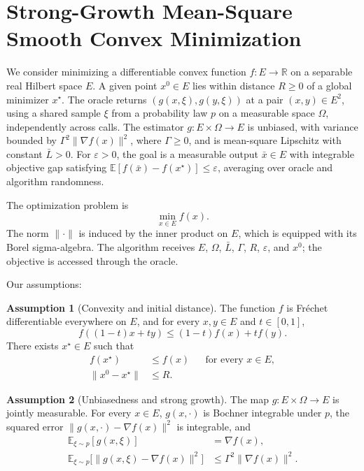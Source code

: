 \documentclass[10pt]{article}
\theoremstyle{definition}
\newtheorem{assumption}{Assumption}
\begin{document}
\section*{Strong-Growth Mean-Square Smooth Convex Minimization}
We consider minimizing a differentiable convex function $f:E\to\mathbb{R}$ on a separable real Hilbert space $E$. A given point $x^0\in E$ lies within distance $R\geq0$ of a global minimizer $x^\star$. The oracle returns $(g(x,\xi),g(y,\xi))$ at a pair $(x,y)\in E^2$, using a shared sample $\xi$ from a probability law $p$ on a measurable space $\Omega$, independently across calls. The estimator $g:E\times\Omega\to E$ is unbiased, with variance bounded by $\Gamma^2\|\nabla f(x)\|^2$, where $\Gamma\geq0$, and is mean-square Lipschitz with constant $\bar{L}>0$. For $\varepsilon>0$, the goal is a measurable output $\bar{x}\in E$ with integrable objective gap satisfying $\mathbb{E}[f(\bar{x})-f(x^\star)]\leq\varepsilon$, averaging over oracle and algorithm randomness.

The optimization problem is
\[
\min_{x\in E} f(x).
\]
The norm $\|\cdot\|$ is induced by the inner product on $E$, which is equipped with its Borel sigma-algebra. The algorithm receives $E$, $\Omega$, $\bar{L}$, $\Gamma$, $R$, $\varepsilon$, and $x^0$; the objective is accessed through the oracle.

Our assumptions:
\begin{assumption}[Convexity and initial distance]
The function $f$ is Fr\'echet differentiable everywhere on $E$, and for every $x,y\in E$ and $t\in[0,1]$,
\[
f((1-t)x+ty)\leq(1-t)f(x)+tf(y).
\]
There exists $x^\star\in E$ such that
\[
\begin{aligned}
f(x^\star)&\leq f(x) &&\text{for every }x\in E,\\
\|x^0-x^\star\|&\leq R.
\end{aligned}
\]
\end{assumption}

\begin{assumption}[Unbiasedness and strong growth]
The map $g:E\times\Omega\to E$ is jointly measurable. For every $x\in E$, $g(x,\cdot)$ is Bochner integrable under $p$, the squared error $\|g(x,\cdot)-\nabla f(x)\|^2$ is integrable, and
\[
\begin{aligned}
\mathbb{E}_{\xi\sim p}[g(x,\xi)]&=\nabla f(x),\\
\mathbb{E}_{\xi\sim p}\bigl[\|g(x,\xi)-\nabla f(x)\|^2\bigr]
&\leq\Gamma^2\|\nabla f(x)\|^2.
\end{aligned}
\]
\end{assumption}
\end{document}
